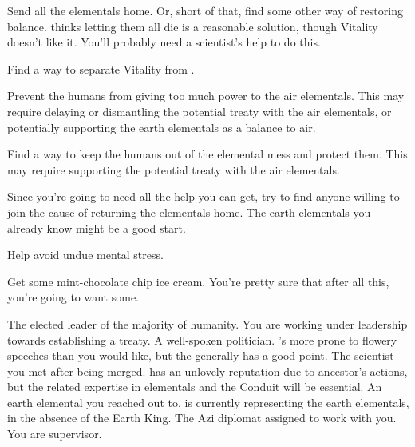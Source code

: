 \documentclass[char]{elementals}
\begin{document}
\begin{itemz}[Goals]
	\item  Send all the elementals home.  Or, short of that, find some other way of restoring balance.  \cAvatar{} thinks letting them all die is a reasonable solution, though Vitality doesn't like it.  You'll probably need a scientist's help to do this.
	\item  Find a way to separate Vitality from \cAvatar{}.
	\item  Prevent the humans from giving too much power to the air elementals.  This may require delaying or dismantling the potential treaty with the air elementals, or potentially supporting the earth elementals as a balance to air.
	\item  Find a way to keep the humans out of the elemental mess and protect them.  This may require supporting the potential treaty with the air elementals.
	\item  Since you're going to need all the help you can get, try to find anyone willing to join the cause of returning the elementals home.  The earth elementals you already know might be a good start.
	\item  Help \cDiplomat{} avoid undue mental stress.
	\item  Get some mint-chocolate chip ice cream.  You're pretty sure that after all this, you're going to want some.
\end{itemz}

\begin{contacts}
	\contact{\cLeader{}}  The elected leader of the majority of humanity.  You are working under \cLeader{\their} leadership towards establishing a treaty.
	\contact{\cDema{}}  A well-spoken politician.  \cDema{\They}'s more prone to flowery speeches than you would like, but the \cDema{\human} generally has a good point.
	\contact{\cGD{}}  The scientist you met after being merged.  \cGD{\They} has an unlovely reputation due to \cGD{\their} ancestor's actions, but the related expertise in elementals and the Conduit will be essential.
	\contact{\cLoyal{}}  An earth elemental you reached out to.  \cLoyal{\They} is currently representing the earth elementals, in the absence of the Earth King.
	\contact{\cDiplomat{}}  The Azi diplomat assigned to work with you.  You are \cDiplomat{\their} supervisor.
\end{contacts}
\end{document}
